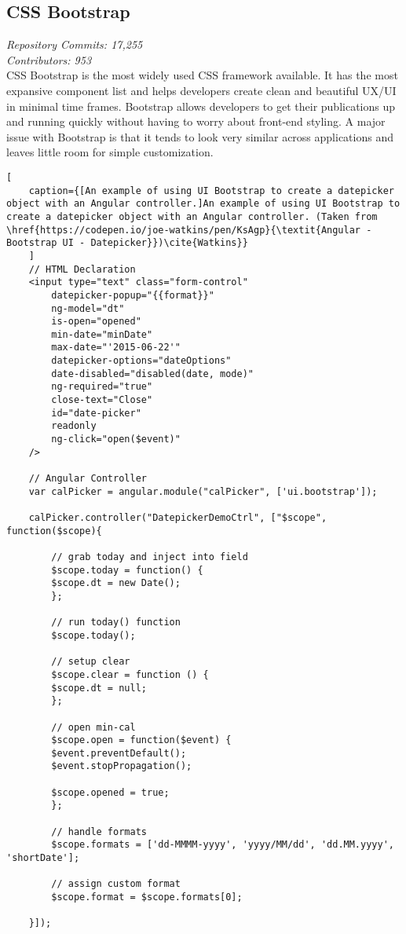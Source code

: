 \documentclass[onecolumn, draftclsnofoot,10pt, compsoc]{IEEEtran}
\begin{document}
\subsection{CSS Bootstrap}
\textit{Repository Commits: 17,255}\\ 
\textit{Contributors: 953}\\
CSS Bootstrap is the most widely used CSS framework available. It has the most expansive component list and helps developers create clean and beautiful UX/UI in minimal time frames. Bootstrap allows developers to get their publications up and running quickly without having to worry about front-end styling. A major issue with Bootstrap is that it tends to look very similar across applications and leaves little room for simple customization.\\
\begin{lstlisting}[
    caption={[An example of using UI Bootstrap to create a datepicker object with an Angular controller.]An example of using UI Bootstrap to create a datepicker object with an Angular controller. (Taken from \href{https://codepen.io/joe-watkins/pen/KsAgp}{\textit{Angular - Bootstrap UI - Datepicker}})\cite{Watkins}}
    ]
    // HTML Declaration
    <input type="text" class="form-control" 
        datepicker-popup="{{format}}" 
        ng-model="dt" 
        is-open="opened" 
        min-date="minDate" 
        max-date="'2015-06-22'"
        datepicker-options="dateOptions" 
        date-disabled="disabled(date, mode)" 
        ng-required="true" 
        close-text="Close" 
        id="date-picker" 
        readonly
        ng-click="open($event)"
    />

    // Angular Controller
    var calPicker = angular.module("calPicker", ['ui.bootstrap']);
    
    calPicker.controller("DatepickerDemoCtrl", ["$scope", function($scope){
        
        // grab today and inject into field
        $scope.today = function() {
        $scope.dt = new Date();
        };
        
        // run today() function
        $scope.today();
    
        // setup clear
        $scope.clear = function () {
        $scope.dt = null;
        };
    
        // open min-cal
        $scope.open = function($event) {
        $event.preventDefault();
        $event.stopPropagation();
    
        $scope.opened = true;
        };
        
        // handle formats
        $scope.formats = ['dd-MMMM-yyyy', 'yyyy/MM/dd', 'dd.MM.yyyy', 'shortDate'];
        
        // assign custom format
        $scope.format = $scope.formats[0];
        
    }]);
\end{lstlisting}
\end{document}
